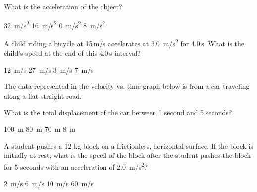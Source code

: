 \documentclass[answers]{exam}
\begin{document}
\begin{questions}
What is the acceleration of the object?

\begin{randomizechoices}
 \choice \SI{32}{m/s^2}
 \choice \SI{16}{m/s^2}
 \correctchoice \SI{0}{m/s^2}
 \choice \SI{8}{m/s^2}
\end{randomizechoices}

\question 
A child riding a bicycle at 15\,m/s accelerates at \SI{3.0}{m/s^2} for 4.0\,s. What is the child's speed at the end of this 4.0\,s
interval?

\begin{randomizechoices}
    \choice \SI{12}{m/s}
    \correctchoice \SI{27}{m/s}
    \choice \SI{3}{m/s}
    \choice \SI{7}{m/s}
\end{randomizechoices}

\ifprintanswers \else \clearpage \fi

\question
The data represented in the velocity vs. time graph below is from a car traveling along a flat straight road.

\begin{center}
\end{center}

What is the total displacement of the car between 1 second and 5 seconds?

\begin{randomizechoices}
    \choice \SI{100}{m}
    \correctchoice \SI{80}{m}
    \choice \SI{70}{m}
    \choice \SI{8}{m}
\end{randomizechoices}

\question
A student pushes a 12-kg block on a frictionless, horizontal surface. If the block is initially at rest, what is the speed of
the block after the student pushes the block for 5 seconds with an acceleration of \SI{2.0}{m/s^2}?

\begin{randomizechoices}
    \choice \SI{2}{m/s}
    \choice \SI{6}{m/s}
    \correctchoice \SI{10}{m/s}
    \choice \SI{60}{m/s}
\end{randomizechoices}


\end{questions}
\end{document}
